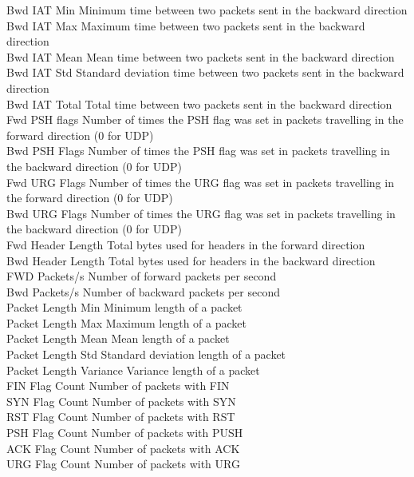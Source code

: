 Bwd IAT Min			Minimum time between two packets sent in the backward direction \\
Bwd IAT Max			Maximum time between two packets sent in the backward direction \\
Bwd IAT Mean			Mean time between two packets sent in the backward direction \\
Bwd IAT Std			Standard deviation time between two packets sent in the backward direction \\
Bwd IAT Total			Total time between two packets sent in the backward direction \\
Fwd PSH flags			Number of times the PSH flag was set in packets travelling in the forward direction (0 for UDP) \\
Bwd PSH Flags			Number of times the PSH flag was set in packets travelling in the backward direction (0 for UDP) \\
Fwd URG Flags			Number of times the URG flag was set in packets travelling in the forward direction (0 for UDP) \\
Bwd URG Flags			Number of times the URG flag was set in packets travelling in the backward direction (0 for UDP) \\
Fwd Header Length		Total bytes used for headers in the forward direction \\
Bwd Header Length		Total bytes used for headers in the backward direction \\
FWD Packets/s			Number of forward packets per second \\
Bwd Packets/s			Number of backward packets per second \\
Packet Length Min 		Minimum length of a packet \\
Packet Length Max		Maximum length of a packet \\
Packet Length Mean 		Mean length of a packet \\
Packet Length Std		Standard deviation length of a packet \\
Packet Length Variance  	Variance length of a packet \\
FIN Flag Count 			Number of packets with FIN \\
SYN Flag Count 			Number of packets with SYN \\
RST Flag Count 			Number of packets with RST \\
PSH Flag Count 			Number of packets with PUSH \\
ACK Flag Count 			Number of packets with ACK \\
URG Flag Count 			Number of packets with URG \\
